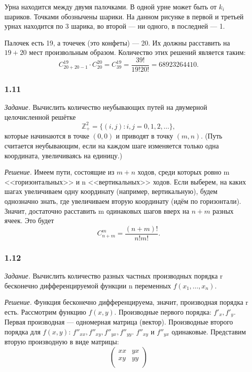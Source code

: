 Урна находится между двумя палочками.
В одной урне может быть от $k_i$ шариков.
Точками обознычены шарики.
На данном рисунке в первой и третьей урнах находится по 3 шарика, во второй --- ни одного, в последней --- 1.

Палочек есть 19, а точечек (это конфеты) --- 20.
Их должны расставить на $19 + 20$ мест произвольным образом.
Количество этих решений является таким:
$$C_{20+20-1}^{19} \cdot C_{20}^{20} =
C_{39}^{19} =
\frac{39!}{19!20!} =
68923264410.$$

\subsubsection*{1.11}

\textit{Задание.} Вычислить количество неубывающих путей на двумерной целочисленной решётке
$$ \mathbb{Z}_+^2 = \{ \left( i, j \right): i, j = 0, 1, 2,  \dotsc \},$$
которые начинаются в точке $ \left( 0, 0 \right) $ и приводят в точку $ \left( m, n \right) $.
(Путь считается неубывающим, если на каждом шаге изменяется только одна координата, увеличиваясь на единицу.)

\textit{Решение.} Имеем пути, состоящие из $m+n$ ходов, среди которых ровно m <<горизонтальных>> и n <<вертикальных>> ходов.
Если выберем, на каких шагах увеличиваем одну координату (например, вертикальную), будем однозначно знать, где увеличиваем вторую координату (идём по горизонтали).
Значит, достаточно расставить m одинаковых шагов вверх на $n+m$ разных ячеек.
Это будет $$ C_{n+m}^m = \frac{ \left( n+m \right)!}{n!m!}.$$

\subsubsection*{1.12}

\textit{Задание.} Вычислить количество разных частных производных порядка r бесконечно дифференцируемой функции n переменных $f\left(x_1,  \dotsc , x_n\right)$.

\textit{Решение.} Функция бесконечно дифференцируема, значит, производная порядка r есть.
Рассмотрим функцию $f(x, y)$.
Производные первого порядка: $f'_x, f'_y$.
Первая производная --- одномерная матрица (вектор).
Производные второго порядка для
$f(x, y)$: $f''_{xx}, f''_{xy}, f''_{yx}, f''_{yy}$. $f''_{xy}$ и $f''_{yx}$
одинаковые.
Представим вторую производную в виде матрицы:
$$
\begin{pmatrix}
  xx & yx \\
  xy & yy \\ 
\end{pmatrix}
$$

